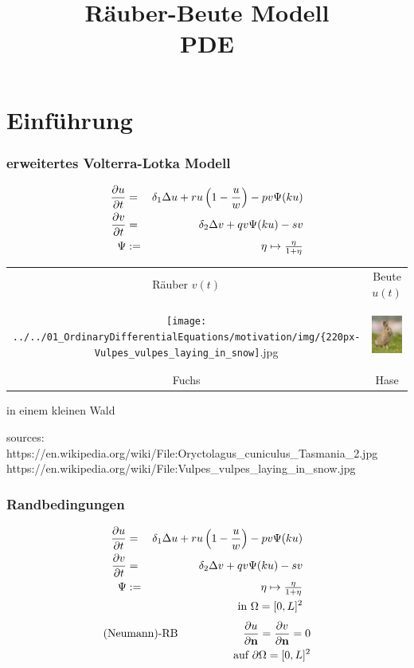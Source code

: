\documentclass[10pt]{beamer}
\title[Räuber-Beute Modell]{Räuber-Beute Modell\\PDE}
\institute[Computerphysik]{Computerphysik WS 18/19}
\date[]{}
\begin{document}
\frame{\titlepage}

\section{Einführung}
\frame
{
  \frametitle{erweitertes Volterra-Lotka Modell}
\begin{eqnarray*}
\frac{\partial u}{\partial t} &=& \delta_1 \Delta u + r u \left(1 - \frac{u}{w} \right) - p v \Psi(k u) \\
\frac{\partial v}{\partial t} &=& \delta_2 \Delta v + q v \Psi(k u) - s v \notag \\
\Psi &:=& \eta \mapsto \tfrac{\eta}{1+\eta} \notag
\end{eqnarray*}

\begin{center}
\begin{tabular}{cc}
 Räuber $v(t)$ & Beute $u(t)$\\ 
 \texttt{[image: ../../01\_OrdinaryDifferentialEquations/motivation/img/\{220px-Vulpes\_vulpes\_laying\_in\_snow]}.jpg} & \includegraphics[height=2cm]{../../01_OrdinaryDifferentialEquations/motivation/img/Oryctolagus_cuniculus_Tasmania_2.jpg}\\ 
 Fuchs & Hase 
\end{tabular}
\end{center}
\begin{flushright}
 in einem kleinen Wald
\end{flushright}
\scriptsize{sources:\\}
\scriptsize{https://en.wikipedia.org/wiki/File:Oryctolagus\_cuniculus\_Tasmania\_2.jpg}
\scriptsize{https://en.wikipedia.org/wiki/File:Vulpes\_vulpes\_laying\_in\_snow.jpg}

}




\frame
{
  \frametitle{Randbedingungen}
\begin{eqnarray*}
\frac{\partial u}{\partial t} &=& \delta_1 \Delta u + r u \left(1 - \frac{u}{w} \right) - p v \Psi(k u) \\
\frac{\partial v}{\partial t} &=& \delta_2 \Delta v + q v \Psi(k u) - s v \notag \\
\Psi &:=& \eta \mapsto \tfrac{\eta}{1+\eta} \notag \\
&& \qquad \qquad  \text{in } \Omega = [0, L]^2 \notag \\
\end{eqnarray*}
\vspace{1pt}
\begin{eqnarray*}
  \text{(Neumann)-RB} && \frac{\partial u}{\partial\mathbf n}=\frac{\partial v}{\partial\mathbf n} = 0 \notag\\
  &&\qquad \qquad \text{auf }  \partial\Omega = [0, L]^2 \\
\end{eqnarray*}
}
\end{document}
